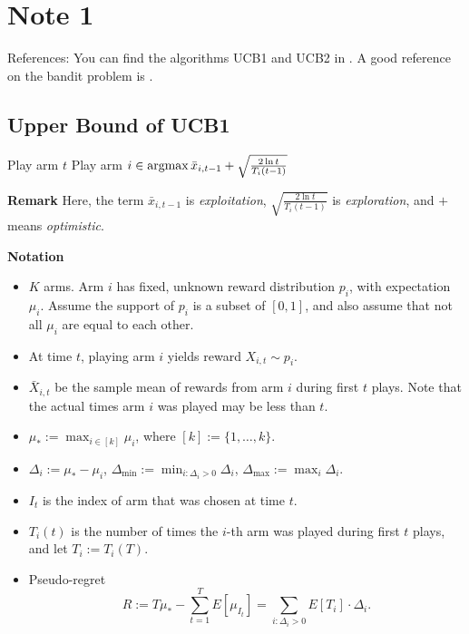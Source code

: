\section{Note 1}

References: You can find the algorithms UCB1 and UCB2 in \cite{Auer2002}.
A good reference on the bandit problem is \cite{MAL024}.

\subsection{Upper Bound of UCB1} %

\begin{alg}[UCB1] \leavevmode
    \begin{framed}
        \begin{algorithmic}
                \State Play arm $t$
            \EndFor
                \State Play arm $i\in\mathop{\mathrm{argmax}} \bar x_{i,t-1} + \sqrt{\frac{2\ln t}{T_i(t-1)}}$
            \EndFor
        \end{algorithmic}
    \end{framed}
\end{alg}

\textbf{Remark}
Here,
the term $\bar x_{i,t-1}$ is \emph{exploitation},
$\sqrt{\frac{2\ln t}{T_i(t-1)}}$ is \emph{exploration},
and $+$ means \emph{optimistic}.

\textbf{Notation}
\begin{itemize}
    \item $K$ arms.
        Arm $i$ has fixed, unknown reward distribution $p_i$,
        with expectation $\mu_i$.
        Assume the support of $p_i$ is a subset of $[0,1]$, and
        also assume that not all $\mu_i$ are equal to each other.
    \item At time $t$, playing arm $i$ yields reward $X_{i,t}\sim p_i$.
    \item $\bar X_{i,t}$ be the sample mean of rewards from arm $i$ during first $t$ plays.
        Note that the actual times arm $i$ was played may be less than $t$.
    \item $\mu_*:=\max_{i\in[k]}\mu_i$, where $[k]:=\{1,\dots,k\}$.
    \item $\Delta_i:=\mu_* - \mu_i$,
        $\Delta_{\text{min}}:=\min_{i:\Delta_i>0}\Delta_i$,
        $\Delta_{\text{max}}:=\max_i \Delta_i$.
    \item $I_t$ is the index of arm that was chosen at time $t$.
    \item $T_i(t)$ is the number of times the $i$-th arm was played during first $t$ plays,
        and let $T_i:=T_i(T)$.
    \item Pseudo-regret
        \begin{equation}
            R:=T\mu_*-\sum_{t=1}^T E[\mu_{I_t}]
            = \sum_{i:\Delta_i>0} E[T_i]\cdot\Delta_i.
        \end{equation}
\end{itemize}


